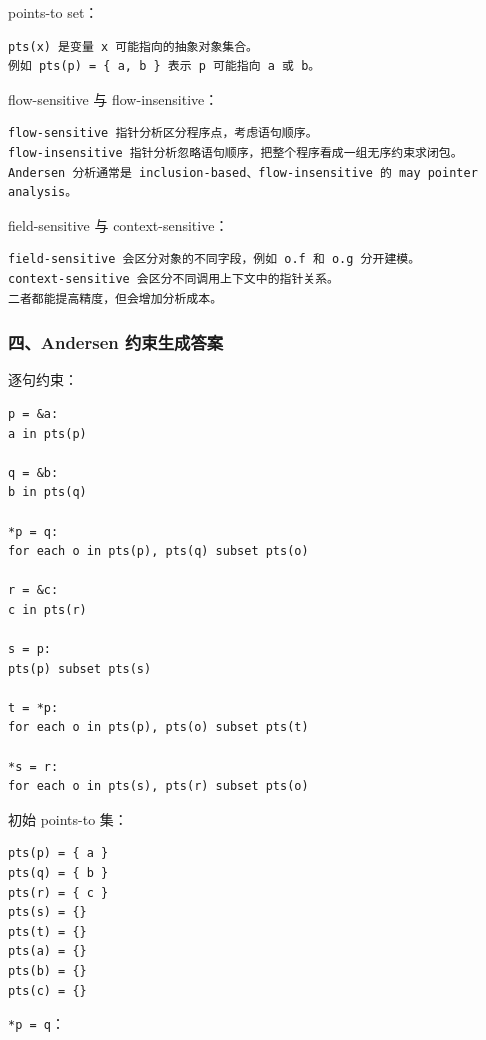 \documentclass[UTF8]{ctexart}
\begin{document}
points-to set：

\begin{Verbatim}[fontsize=\small,breaklines=true]
pts(x) 是变量 x 可能指向的抽象对象集合。
例如 pts(p) = { a, b } 表示 p 可能指向 a 或 b。
\end{Verbatim}

flow-sensitive 与 flow-insensitive：

\begin{Verbatim}[fontsize=\small,breaklines=true]
flow-sensitive 指针分析区分程序点，考虑语句顺序。
flow-insensitive 指针分析忽略语句顺序，把整个程序看成一组无序约束求闭包。
Andersen 分析通常是 inclusion-based、flow-insensitive 的 may pointer analysis。
\end{Verbatim}

field-sensitive 与 context-sensitive：

\begin{Verbatim}[fontsize=\small,breaklines=true]
field-sensitive 会区分对象的不同字段，例如 o.f 和 o.g 分开建模。
context-sensitive 会区分不同调用上下文中的指针关系。
二者都能提高精度，但会增加分析成本。
\end{Verbatim}

\subsubsection*{四、Andersen 约束生成答案}

逐句约束：

\begin{Verbatim}[fontsize=\small,breaklines=true]
p = &a:
a in pts(p)

q = &b:
b in pts(q)

*p = q:
for each o in pts(p), pts(q) subset pts(o)

r = &c:
c in pts(r)

s = p:
pts(p) subset pts(s)

t = *p:
for each o in pts(p), pts(o) subset pts(t)

*s = r:
for each o in pts(s), pts(r) subset pts(o)
\end{Verbatim}

初始 points-to 集：

\begin{Verbatim}[fontsize=\small,breaklines=true]
pts(p) = { a }
pts(q) = { b }
pts(r) = { c }
pts(s) = {}
pts(t) = {}
pts(a) = {}
pts(b) = {}
pts(c) = {}
\end{Verbatim}

\texttt{*p = q}：
\end{document}
